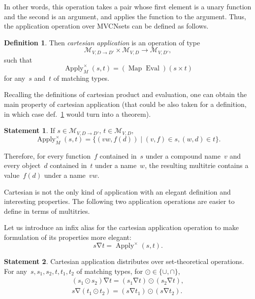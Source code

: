\documentclass{article}
\theoremstyle{definition}
\newtheorem{Df}{Definition}
\newtheorem{St}{Statement}
\newcommand{\setcharmvcn}{M}
\newcommand{\setsymbol}[3]{\mathcal{#1}_{#2,#3}}
\newcommand{\setmvcn}[2]{\setsymbol{\setcharmvcn}{#1}{#2}}
\newcommand{\fmap}{\operatorname{Map}}
\newcommand{\apply}{\operatorname{Apply}}
\newcommand{\eval}{\operatorname{Eval}}
\newcommand{\inapply}{\mathbin{\nabla}}
\begin{document}
In other words, this operation takes a pair whose first element is a unary
function and the second is an argument, and applies the function to the
argument. Thus, the application operation over MVCNsets can be defined as
follows.

\begin{Df}\label{df:mvcn-apply-cartesian}
Then \emph{cartesian application} is an operation of type
\[
\setmvcn{V}{D\to D'} \times \setmvcn{V}{D} \to \setmvcn{V}{D'} ,
\]
such that
\[
  \apply_{\setcharmvcn}^{\times} (s, t) = (\fmap \eval) (s \times t)
\]
for any~$s$ and~$t$ of matching types.
\end{Df}

Recalling the definitions of cartesian product and evaluation, one can
obtain the main property of cartesian application (that could be also taken
for a definition, in which case def.~\ref{df:mvcn-apply-cartesian} would turn
into a theorem).
 
\begin{St}\label{st:mvcn-apply-cartesian}
If $s\in \setmvcn{V}{D\to D'}$, $t\in \setmvcn{V}{D}$,
\[
  \apply_{\setcharmvcn}^{\times} (s, t) =
    \{ (vw, f(d)) \mid (v,f) \in s, (w,d) \in t \} .
\]
\end{St}

Therefore, for every function~$f$ contained in~$s$ under a compound name~$v$
and every object~$d$ contained in~$t$ under a name~$w$, the resulting
multitrie contains a value~$f(d)$ under a name~$vw$.

Cartesian is not the only kind of application with an elegant definition and
interesting properties.  The following two application operations are
easier to define in terms of multitries.

Let us introduce an infix alias for the cartesian application operation to make
formulation of its properties more elegant:
\[
  s \inapply t = \apply^{\times} (s, t) .
\]

\begin{St}\label{st:apply-distr}
Cartesian application distributes over set-theoretical operations.
For any~$s, s_1, s_2, t, t_1, t_2$ of matching types,
for $\odot \in \{\cup, \cap \}$,
\begin{eqnarray*}
  (s_1 \odot s_2) \inapply t =
    (s_1 \inapply t) \odot (s_2 \inapply t) , \\
  s \inapply (t_1 \odot t_2) =
    (s \inapply t_1) \odot (s \inapply t_2) .
\end{eqnarray*}
\end{St}
\end{document}
